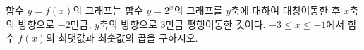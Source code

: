 함수 $y=f(x)$의 그래프는 함수 $y=2^x$의 그래프를 $y$축에 대하여 대칭이동한 후 $x$축의 방향으로 $-2$만큼, $y$축의 방향으로 $3$만큼 평행이동한 것이다. $-3\le x\le -1$에서 함수 $f(x)$의 최댓값과 최솟값의 곱을 구하시오.
